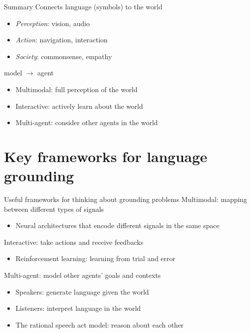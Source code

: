 \documentclass[usenames,dvipsnames,notes]{beamer}
\begin{document}
\begin{frame}
    {Summary}
    Connects language (symbols) to the world\\
    \begin{itemize}
        \item \emph{Perception}: vision, audio
        \item \emph{Action}: navigation, interaction
        \item \emph{Society}: commonsense, empathy
    \end{itemize}

    model $\to$ agent\\
    \begin{itemize}
        \item Multimodal: full perception of the world
        \item Interactive: actively learn about the world 
        \item Multi-agent: consider other agents in the world 
    \end{itemize}
\end{frame}

\section{Key frameworks for language grounding}
\begin{frame}
    {Useful frameworks for thinking about grounding problems}
    Multimodal: mapping between different types of signals\\
    \begin{itemize}
        \item Neural architectures that encode different signals in the same space
    \end{itemize}

    Interactive: take actions and receive feedbacks\\
    \begin{itemize}
        \item Reinforcement learning: learning from trial and error
    \end{itemize}

    Multi-agent: 
            model other agents' goals and contexts\\
    \begin{itemize}
        \item Speakers: generate language given the world 
        \item Listeners: interpret language in the world 
        \item The rational speech act model: reason about each other
    \end{itemize}
\end{frame}
\end{document}
